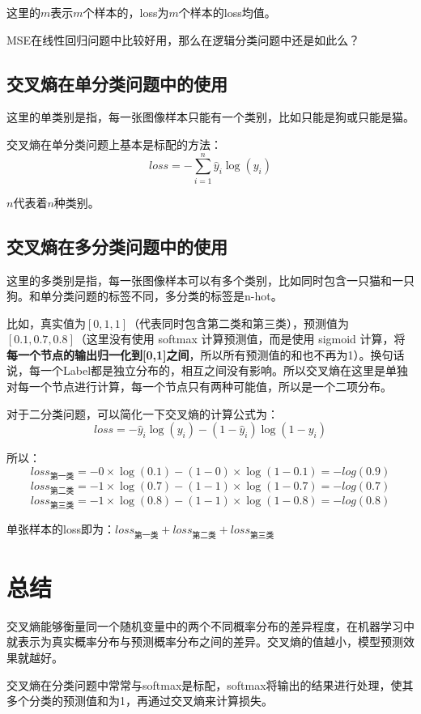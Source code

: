 \documentclass[12pt]{article}
\begin{document}
这里的$m$表示$m$个样本的，loss为$m$个样本的loss均值。

MSE在线性回归问题中比较好用，那么在逻辑分类问题中还是如此么？

\subsection{交叉熵在单分类问题中的使用}
这里的单类别是指，每一张图像样本只能有一个类别，比如只能是狗或只能是猫。

交叉熵在单分类问题上基本是标配的方法：
$$
loss = -\sum_{i=1}^n{\hat y_i}\log(y_i)
$$

$n$代表着$n$种类别。

\subsection{交叉熵在多分类问题中的使用}
这里的多类别是指，每一张图像样本可以有多个类别，比如同时包含一只猫和一只狗。和单分类问题的标签不同，多分类的标签是n-hot。

比如，真实值为$[0,1,1]$（代表同时包含第二类和第三类），预测值为$[0.1, 0.7, 0.8]$（这里没有使用 softmax 计算预测值，而是使用 sigmoid 计算，将\textbf{每一个节点的输出归一化到[0,1]之间}，所以所有预测值的和也不再为1）。换句话说，每一个Label都是独立分布的，相互之间没有影响。所以交叉熵在这里是单独对每一个节点进行计算，每一个节点只有两种可能值，所以是一个二项分布。

对于二分类问题，可以简化一下交叉熵的计算公式为：
$$
loss = -{\hat y_i}\log(y_i) - (1-\hat y_i)\log{(1-y_i)}
$$

所以：
$$
loss_{\text{第一类}} = -0\times\log(0.1) - (1-0)\times\log(1-0.1) = -log(0.9) 
$$
$$
loss_{\text{第二类}} = -1\times\log(0.7) - (1-1)\times\log(1-0.7) = -log(0.7) 
$$
$$
loss_{\text{第三类}} = -1\times\log(0.8) - (1-1)\times\log(1-0.8) = -log(0.8) 
$$

单张样本的loss即为：$loss_{\text{第一类}} +loss_{\text{第二类}} + loss_{\text{第三类}}$

\section{总结}
交叉熵能够衡量同一个随机变量中的两个不同概率分布的差异程度，在机器学习中就表示为真实概率分布与预测概率分布之间的差异。交叉熵的值越小，模型预测效果就越好。

交叉熵在分类问题中常常与softmax是标配，softmax将输出的结果进行处理，使其多个分类的预测值和为1，再通过交叉熵来计算损失。



\end{document}
